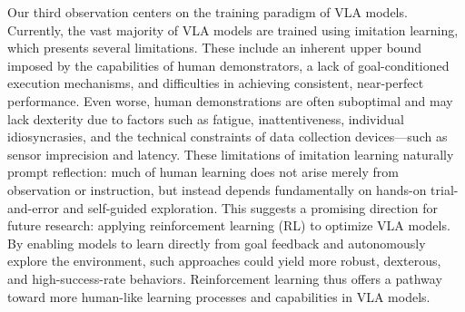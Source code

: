\documentclass[10pt, a4paper, logo, copyright]{googledeepmind} %
\begin{document}

Our third observation centers on the training paradigm of VLA models. Currently, the vast majority of VLA models are trained using imitation learning, which presents several limitations. These include an inherent upper bound imposed by the capabilities of human demonstrators, a lack of goal-conditioned execution mechanisms, and difficulties in achieving consistent, near-perfect performance. Even worse, human demonstrations are often suboptimal and may lack dexterity due to factors such as fatigue, inattentiveness, individual idiosyncrasies, and the technical constraints of data collection devices—such as sensor imprecision and latency. These limitations of imitation learning naturally prompt reflection: much of human learning does not arise merely from observation or instruction, but instead depends fundamentally on hands-on trial-and-error and self-guided exploration. This suggests a promising direction for future research: applying reinforcement learning (RL) to optimize VLA models. By enabling models to learn directly from goal feedback and autonomously explore the environment, such approaches could yield more robust, dexterous, and high-success-rate behaviors. Reinforcement learning thus offers a pathway toward more human-like learning processes and capabilities in VLA models.
\end{document}
